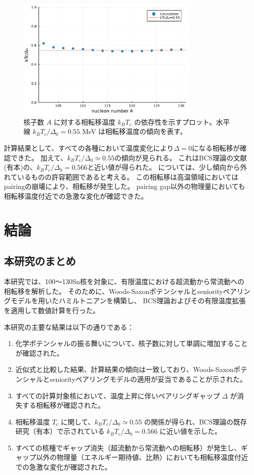 \documentclass[a4paper]{jsreport}
\begin{document}
  \begin{figure}[H]
    \centering
    \includegraphics[width=0.8\textwidth]{main_fig/kTc_vs_A.pdf}
    \caption{核子数 $A$ に対する相転移温度 $k_B T_c$ の依存性を示すプロット。水平線 $k_B T_c/\Delta_0 = 0.55$ MeV は相転移温度の傾向を表す。}
  \end{figure}
  
  計算結果として、すべての各種において温度変化により\(\Delta=0\)になる相転移が確認できた。
  加えて、$k_B T_c/\Delta_0\simeq0.55$の傾向が見られる。
  これはBCS理論の文献(有本\cite{arimoto})の、\(k_BT_c/\Delta_0=0.566\)と近い値が得られた。
  については、少し傾向から外れているものの許容範囲であると考える。
  この相転移は高温領域においてはpairingの崩壊により、相転移が発生した。
  pairing gap以外の物理量においても相転移温度付近での急激な変化が確認できた。

\chapter{結論}
  \section{本研究のまとめ}
  本研究では、100〜130Sn核を対象に、有限温度における超流動から常流動への相転移を解析した。  
  そのために、Woods-Saxonポテンシャルとseniorityペアリングモデルを用いたハミルトニアンを構築し、  
  BCS理論およびその有限温度拡張を適用して数値計算を行った。

  本研究の主要な結果は以下の通りである：
  \begin{enumerate}
      \item 化学ポテンシャルの振る舞いについて、核子数に対して単調に増加することが確認された。
      \item 近似式と比較した結果、計算結果の傾向は一致しており、Woods-Saxonポテンシャルとseniorityペアリングモデルの適用が妥当であることが示された。
      \item すべての計算対象核において、温度上昇に伴いペアリングギャップ $\Delta$ が消失する相転移が確認された。
      \item 相転移温度 $T_c$ に関して、$k_B T_c/\Delta_0 \simeq 0.55$ の関係が得られ、BCS理論の既存研究（有本\cite{arimoto}）で示されている $k_B T_c/\Delta_0=0.566$ に近い値を示した。
      \item すべての核種でギャップ消失（超流動から常流動への相転移）が発生し、ギャップ以外の物理量（エネルギー期待値、比熱）においても相転移温度付近での急激な変化が確認された。
  \end{enumerate}
\end{document}
